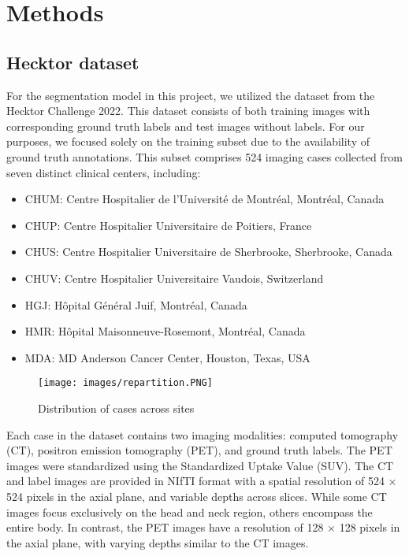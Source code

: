 %
%
%


\chapter{Methods}
\section{Hecktor dataset}
For the segmentation model in this project, we utilized the dataset from the Hecktor Challenge 2022. This dataset consists of both training images with corresponding ground truth labels and test images without labels. For our purposes, we focused solely on the training subset due to the availability of ground truth annotations. This subset comprises 524 imaging cases collected from seven distinct clinical centers, including:

\begin{itemize}
    \setlength\itemsep{1pt}
    \setlength\parskip{0pt}
    \setlength\topsep{0pt}
    \item CHUM: Centre Hospitalier de l’Université de Montréal, Montréal, Canada
    \item CHUP: Centre Hospitalier Universitaire de Poitiers, France
    \item CHUS: Centre Hospitalier Universitaire de Sherbrooke, Sherbrooke, Canada
    \item CHUV: Centre Hospitalier Universitaire Vaudois, Switzerland
    \item HGJ: Hôpital Général Juif, Montréal, Canada
    \item HMR: Hôpital Maisonneuve-Rosemont, Montréal, Canada
    \item MDA: MD Anderson Cancer Center, Houston, Texas, USA
\end{itemize}
\begin{figure}[ht]
    \centering
    \texttt{[image: images/repartition.PNG]}
    \caption{Distribution of cases across sites}
\end{figure}
\newpage
Each case in the dataset contains two imaging modalities: computed tomography (CT), positron emission tomography (PET), and ground truth labels. The PET images were standardized using the Standardized Uptake Value (SUV). The CT and label images are provided in NIfTI format with a spatial resolution of 524 × 524 pixels in the axial plane, and variable depths across slices. While some CT images focus exclusively on the head and neck region, others encompass the entire body. In contrast, the PET images have a resolution of 128 × 128 pixels in the axial plane, with varying depths similar to the CT images.

